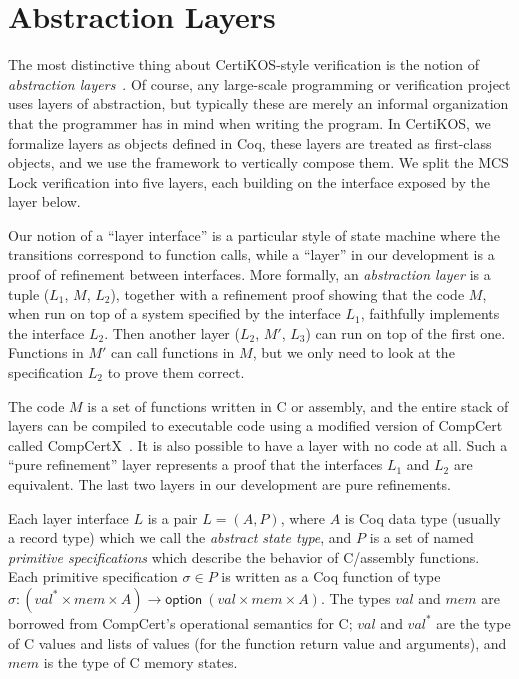 \section{Abstraction Layers}
\label{sec:layers}

The most distinctive thing about CertiKOS-style verification is the
notion of \emph{abstraction layers}~\cite{dscal15}. Of course, any
large-scale programming or verification project uses layers of
abstraction, but typically these are merely an informal organization
that the programmer has in mind when writing the program. In CertiKOS,
we formalize layers as objects defined in Coq, these layers are
treated as first-class objects, and we use the framework to vertically
compose them. We split the MCS Lock verification into
five layers, each building on the interface exposed by the layer
below.

Our notion of a ``layer interface'' is a particular style of
state machine where the transitions correspond to function calls, while a
``layer'' in our development is a proof of refinement between
interfaces. More formally,  an \emph{abstraction layer} is a
tuple ($L_1$, $M$, $L_2$), together with a refinement proof showing
that the code $M$, when run on top of a system specified by the
interface $L_1$, faithfully implements the interface $L_2$.
Then  another layer ($L_2$, $M'$, $L_3$) can run on top of
the first one. Functions in $M'$ can call functions in $M$,
but we only need to look at the specification $L_2$ to prove them correct.

The code $M$ is a set of functions written in C or assembly, and the
entire stack of layers can be compiled to executable code using a
modified version of CompCert called CompCertX~\cite{dscal15}.  It is
also possible to have a layer with no code at all. Such a ``pure
refinement'' layer represents a proof that the interfaces $L_1$ and
$L_2$ are equivalent. The last two layers in our development are pure
refinements.

Each layer interface $L$ is a pair $L = (A,P)$, where $A$ is Coq data
type (usually a record type) which we call the \emph{abstract state
  type},  and $P$ is a set of named \emph{primitive specifications}
which describe the behavior of C/assembly functions.
Each primitive
specification $\sigma \in P$ is written as a Coq function of type
$\sigma : (\mathit{val}^* \times \mathit{mem} \times A) \rightarrow
\mathsf{option}\ (\mathit{val} \times \mathit{mem} \times A)$.
The types $\mathit{val}$ and $\mathit{mem}$ are borrowed from
CompCert's operational semantics for C; $\mathit{val}$ and
$\mathit{val}^*$ are the type of C values and lists of values (for the
function return value and arguments), and $\mathit{mem}$ is the type of C
memory states. 

